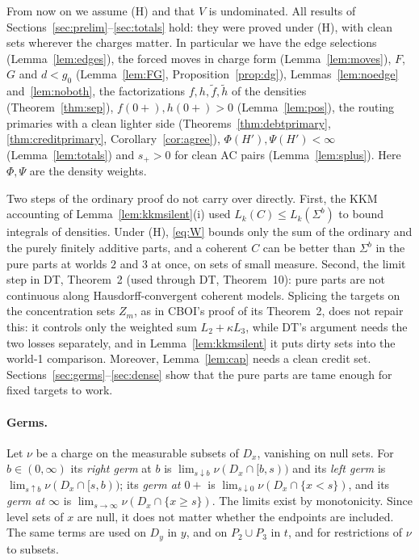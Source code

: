 \documentclass[11pt]{article}
\theoremstyle{definition}\newtheorem{definition}[theorem]{Definition}
\theoremstyle{remark}\newtheorem{remark}[theorem]{Remark}
\newcommand{\ftil}{\tilde f}
\newcommand{\htil}{\tilde h}
\begin{document}
From now on we assume (H) and that $V$ is undominated. All results of
Sections~\ref{sec:prelim}--\ref{sec:totals} hold: they were proved under (H),
with clean sets wherever the charges matter. In particular we have the edge
selections (Lemma~\ref{lem:edges}), the forced moves in charge form
(Lemma~\ref{lem:moves}), $F$, $G$ and $d<g_0$ (Lemma~\ref{lem:FG},
Proposition~\ref{prop:dg}), Lemmas~\ref{lem:noedge} and~\ref{lem:noboth},
the factorizations $f,h,\ftil,\htil$ of the densities
(Theorem~\ref{thm:sep}), $f(0+),h(0+)>0$ (Lemma~\ref{lem:pos}), the routing
primaries with a clean lighter side (Theorems~\ref{thm:debtprimary},
\ref{thm:creditprimary}, Corollary~\ref{cor:agree}),
$\Phi(H'),\Psi(H')<\infty$ (Lemma~\ref{lem:totals}) and $s_+>0$ for clean AC
pairs (Lemma~\ref{lem:splus}). Here $\Phi,\Psi$ are the density weights.

Two steps of the ordinary proof do not carry over directly. First, the KKM
accounting of Lemma~\ref{lem:kkmsilent}(i) used $L_k(C)\le L_k(\Sigma^b)$ to
bound integrals of densities. Under (H), \eqref{eq:W} bounds only the sum of
the ordinary and the purely finitely additive parts, and a coherent $C$ can be
better than $\Sigma^b$ in the pure parts at worlds $2$ and $3$ at once, on
sets of small measure. Second, the limit step in DT, Theorem~2 (used through
DT, Theorem~10): pure parts are not continuous along Hausdorff-convergent
coherent models. Splicing the targets on the concentration sets $Z_m$, as in
CBOI's proof of its Theorem~2, does not repair this: it controls only the
weighted sum $L_2+\kappa L_3$, while DT's argument needs the two losses
separately, and in Lemma~\ref{lem:kkmsilent} it puts dirty sets into the
world-1 comparison. Moreover, Lemma~\ref{lem:cap} needs a clean credit set.
Sections~\ref{sec:germs}--\ref{sec:dense} show that the pure parts are tame
enough for fixed targets to work.

\paragraph{Germs.} Let $\nu$ be a charge on the measurable subsets of $D_x$,
vanishing on null sets. For $b\in(0,\infty)$ its \emph{right germ} at $b$ is
$\lim_{s\downarrow b}\nu(D_x\cap[b,s))$ and its \emph{left germ} is
$\lim_{s\uparrow b}\nu(D_x\cap[s,b))$; its \emph{germ at $0+$} is
$\lim_{s\downarrow0}\nu(D_x\cap\{x<s\})$, and its \emph{germ at $\infty$} is
$\lim_{s\to\infty}\nu(D_x\cap\{x\ge s\})$. The limits exist by monotonicity.
Since level sets of $x$ are null, it does not matter whether the endpoints
are included. The same terms are used on $D_y$ in $y$, and on $P_2\cup P_3$
in $t$, and for restrictions of $\nu$ to subsets.
\end{document}
